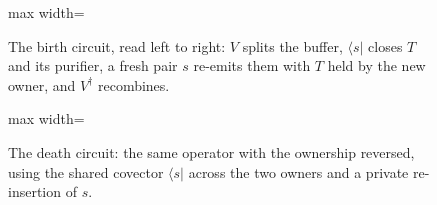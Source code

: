 \documentclass[aps,prx,reprint,superscriptaddress,floatfix,nofootinbib,longbibliography,amsmath,amssymb]{revtex4-2}
\theoremstyle{plain}
\theoremstyle{definition}
\begin{document}
\begin{figure}[t]
\centering
\begin{adjustbox}{max width=\linewidth}

\end{adjustbox}
\caption{The birth circuit, read left to right: $V$ splits the buffer, $\langle s|$ closes $T$ and its purifier, a fresh pair $s$ re-emits them with $T$ held by the new owner, and $V^\dagger$ recombines.}\label{fig:qc-birth}
\end{figure}

\begin{figure}[t]
\centering
\begin{adjustbox}{max width=\linewidth}

\end{adjustbox}
\caption{The death circuit: the same operator with the ownership reversed, using the shared covector $\langle s|$ across the two owners and a private re-insertion of $s$.}\label{fig:qc-death}
\end{figure}
\end{document}
